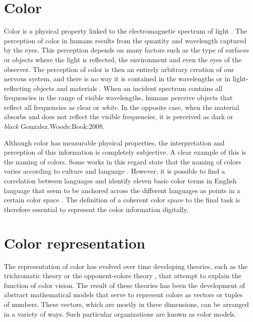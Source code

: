 \section{Color}

Color is a physical property linked to the electromagnetic spectrum of light \citep{Beyerer.Leon.ea:Book:2016}. The perception of color in humans results from the quantity and wavelength captured by the eyes. This perception depends on many factors such as the type of surfaces or objects where the light is reflected, the environment and even the eyes of the observer. The perception of color is then an entirely arbitrary creation of our nervous system, and there is no way it is contained in the wavelengths or in light-reflecting objects and materials \citep{Goldstein:Book:2009} \citep{Beyerer.Leon.ea:Book:2016}. When an incident spectrum contains all frequencies in the range of visible wavelengths, humans perceive objects that reflect all frequencies as clear or \textit{white}. In the opposite case, when the material absorbs and does not reflect the visible frequencies, it is perceived as dark or \textit{black} {Gonzalez.Woods:Book:2008}. 

Although color has measurable physical properties, the interpretation and perception of this information is completely subjective. A clear example of this is the naming of colors. Some works in this regard state that the naming of colors varies according to culture and language \citep{Berlin.Kay:Book:1991}. However, it is possible to find a correlation between languages and identify eleven basic color terms in English language that  seem to be anchored across the different languages as points in a certain color space \citep{Kay.Regier:PNAS:2003}. The definition of a coherent color space to the final task is therefore essential to represent the color information digitally.


\section{Color representation}

The representation of color has evolved over time developing theories, such as the trichromatic theory or the opponent-colors theory \citep{Fairchild:Book:2005}, that attempt to explain the function of color vision. The result of these theories has been the development of abstract mathematical models that serve to represent colors as vectors or tuples of numbers. These vectors, which are mostly in three dimensions, can be arranged in a variety of ways. Such particular organizations are known as color models.

